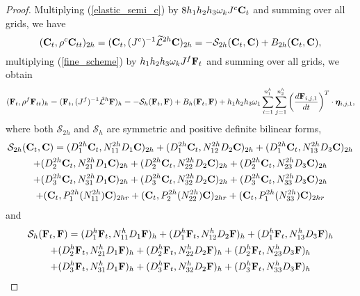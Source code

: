 \begin{proof}
 Multiplying (\ref{elastic_semi_c}) by $8h_1h_2h_3\omega_kJ^{c}{\bf C}_t$ and summing over all grids, we have
\begin{equation*}\label{coarse_simple}
({\bf C}_t, {\rho}^{c}{\bf C}_{tt})_{2h} = ({\bf C}_t,({J^c})^{-1}\wt{\mathcal{L}}^{2h}{\bf C})_{2h} = -\mathcal{S}_{2h}({\bf C}_t,{\bf C}) + B_{2h}({\bf C}_t,{{\bf C}}),
\end{equation*}
multiplying (\ref{fine_scheme}) by $h_1h_2h_3\omega_kJ^f{\bf F}_t$ and summing over all grids, we obtain
\begin{equation*}
({\bf F}_t, {\rho}^f{\bf F}_{tt})_h = ({\bf F}_t,({J^f})^{-1}\hat{\mathcal{L}}^h{\bf F})_h = -\mathcal{S}_{h}({\bf F}_t,{\bf F}) + B_h({\bf F}_t,{\bf F}) 
+h_1h_2h_3\omega_1\sum_{i = 1}^{n_1^h}\sum_{j=1}^{n_2^h} \left(\frac{d{\bf F}_{i,j,1}}{dt}\right)^T\cdot{\bm \eta}_{i,j,1},
\end{equation*}
where  both $\mathcal{S}_{2h}$ and $\mathcal{S}_{h}$ are symmetric and positive definite bilinear forms, 
\begin{multline*}
\mathcal{S}_{2h}({\bf C}_t,{\bf C}) = ({D}_1^{2h}{\bf C}_t,{N}_{11}^{2h}{D}_1{\bf C})_{2h} +  ({D}_1^{2h}{\bf C}_t,{N}_{12}^{2h}{D}_2{\bf C})_{2h} +  ({D}_1^{2h}{\bf C}_t,{N}_{13}^{2h}{D}_3{\bf C})_{2h}\\
 +  ({D}_2^{2h}{\bf C}_t,{N}_{21}^{2h}{D}_1{\bf C})_{2h} 
+  ({D}_2^{2h}{\bf C}_t,{N}_{22}^{2h}{D}_2{\bf C})_{2h} +  ({D}_2^{2h}{\bf C}_t,{N}_{23}^{2h}{D}_3{\bf C})_{2h} \\
+  ({D}_3^{2h}{\bf C}_t,{N}_{31}^{2h}{D}_1{\bf C})_{2h} 
+  ({D}_3^{2h}{\bf C}_t,{N}_{32}^{2h}{D}_2{\bf C})_{2h} +  ({D}_3^{2h}{\bf C}_t,{N}_{33}^{2h}{D}_3{\bf C})_{2h}\\
+ ({\bf C}_t, P^{2h}_1(N_{11}^{2h}){\bf C})_{2hr} + ({\bf C}_t, P^{2h}_2(N_{22}^{2h}){\bf C})_{2hr} + ({\bf C}_t, P^{2h}_1(N_{33}^{2h}){\bf C})_{2hr}
\end{multline*}
and 
\begin{multline*}
\mathcal{S}_{h}({\bf F}_t,{\bf F}) = ({D}_1^{h}{\bf F}_t,{N}_{11}^{h}{D}_1{\bf F})_{h} +  ({D}_1^{h}{\bf F}_t,{N}_{12}^{h}{D}_2{\bf F})_{h} +  ({D}_1^{h}{\bf F}_t,{N}_{13}^{h}{D}_3{\bf F})_{h}\\
+  ({D}_2^{h}{\bf F}_t,{N}_{21}^{h}{D}_1{\bf F})_{h} 
+  ({D}_2^{h}{\bf F}_t,{N}_{22}^{h}{D}_2{\bf F})_{h} +  ({D}_2^{h}{\bf F}_t,{N}_{23}^{h}{D}_3{\bf F})_{h} \\
+  ({D}_3^{h}{\bf F}_t,{N}_{31}^{h}{D}_1{\bf F})_{h} 
+  ({D}_3^{h}{\bf F}_t,{N}_{32}^{h}{D}_2{\bf F})_{h} +  ({D}_3^{h}{\bf F}_t,{N}_{33}^{h}{D}_3{\bf F})_{h}\\

\end{multline*}
\end{proof}
